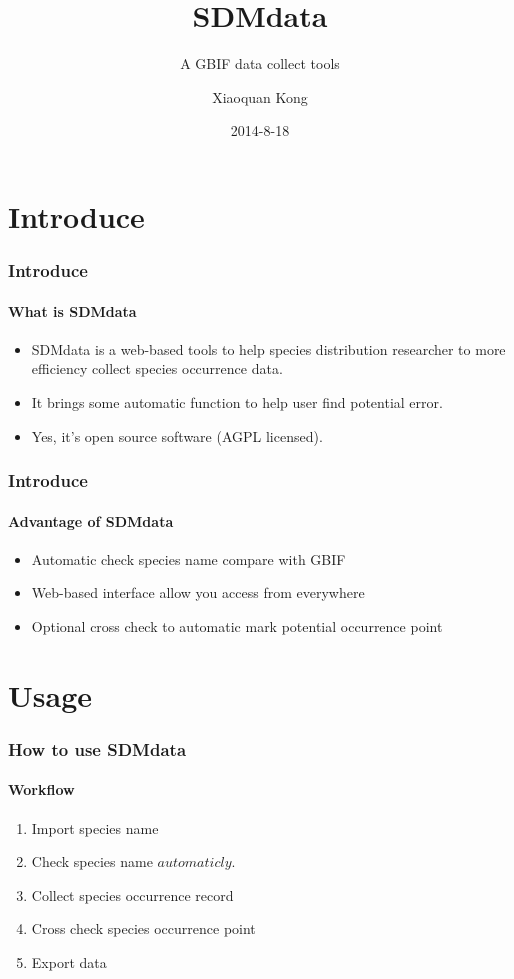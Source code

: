 \documentclass{beamer}
\begin{document}
\title{SDMdata}
\subtitle{A GBIF data collect tools}
\author{Xiaoquan Kong}
\institute[]{}
\subject{}
\keywords{}
\date{2014-8-18}

\maketitle
\section{Introduce}
\begin{frame}
	\frametitle{Introduce}
	\framesubtitle{What is SDMdata}
	\begin{itemize}
		\item SDMdata is a web-based tools to help species distribution researcher to more efficiency collect species occurrence data.
		\item It brings some automatic function to help user find potential error.
		\item Yes, it's open source software (AGPL licensed). 
	\end{itemize}
\end{frame}
\begin{frame}
    \frametitle{Introduce}
    \framesubtitle{Advantage of SDMdata}
    \begin{itemize}
	    \item Automatic check species name compare with GBIF
	    \item Web-based interface allow you access from everywhere
	    \item Optional cross check to automatic mark potential occurrence point
    \end{itemize}
\end{frame}
\section{Usage}
\begin{frame}
	\frametitle{How to use SDMdata}
	\framesubtitle{Workflow}
	\begin{enumerate}
		\item Import species name
		\item Check species name \(automaticly\).
		\item Collect species occurrence record
		\item Cross check species occurrence point
		\item Export data
	\end{enumerate}
\end{frame}
\end{document}
